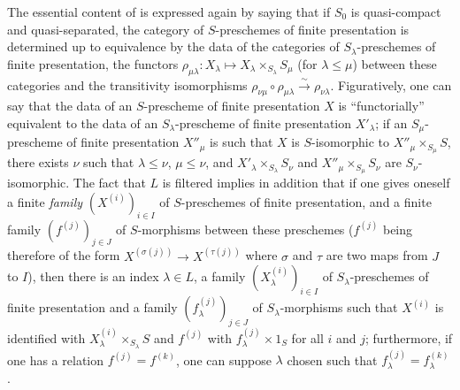 \begin{env}[8.8.3]
\label{IV.8.8.3}
The essential content of  is expressed again by saying that if $S_0$ is quasi-compact and quasi-separated, the category of $S$-preschemes of finite presentation is determined up to equivalence by the data of the categories of $S_\lambda$-preschemes of finite presentation, the functors $\rho_{\mu\lambda}:X_\lambda\mapsto X_\lambda\times_{S_\lambda}S_\mu$ (for $\lambda\leqslant\mu$) between these categories and the transitivity isomorphisms $\rho_{\nu\mu}\circ\rho_{\mu\lambda}\xrightarrow{\sim}\rho_{\nu\lambda}$.
Figuratively, one can say that the data of an $S$-prescheme of finite presentation $X$ is ``functorially'' equivalent to the data of an $S_\lambda$-prescheme of finite presentation $X'_\lambda$; if an $S_\mu$-prescheme of finite presentation $X''_\mu$ is such that $X$ is $S$-isomorphic to $X''_\mu\times_{S_\mu}S$, there exists $\nu$ such that $\lambda\leqslant\nu$, $\mu\leqslant\nu$, and $X'_\lambda\times_{S_\lambda}S_\nu$ and $X''_\mu\times_{S_\mu}S_\nu$ are $S_\nu$-isomorphic.
The fact that $L$ is filtered implies in addition that if one gives oneself a finite \emph{family} $(X^{(i)})_{i\in I}$ of $S$-preschemes of finite presentation, and a finite family $(f^{(j)})_{j\in J}$ of $S$-morphisms between these preschemes ($f^{(j)}$ being therefore of the form $X^{(\sigma(j))}\to X^{(\tau(j))}$ where $\sigma$ and $\tau$ are two maps from $J$ to $I$), then there is an index $\lambda\in L$, a family $(X^{(i)}_\lambda)_{i\in I}$ of $S_\lambda$-preschemes of finite presentation and a family $(f^{(j)}_\lambda)_{j\in J}$ of $S_\lambda$-morphisms such that $X^{(i)}$ is identified with $X^{(i)}_\lambda\times_{S_\lambda}S$ and $f^{(j)}$ with $f^{(j)}_\lambda\times 1_S$ for all $i$ and $j$; furthermore, if one has a relation $f^{(j)}=f^{(k)}$, one can suppose $\lambda$ chosen such that $f^{(j)}_\lambda=f^{(k)}_\lambda$.


\end{env}
